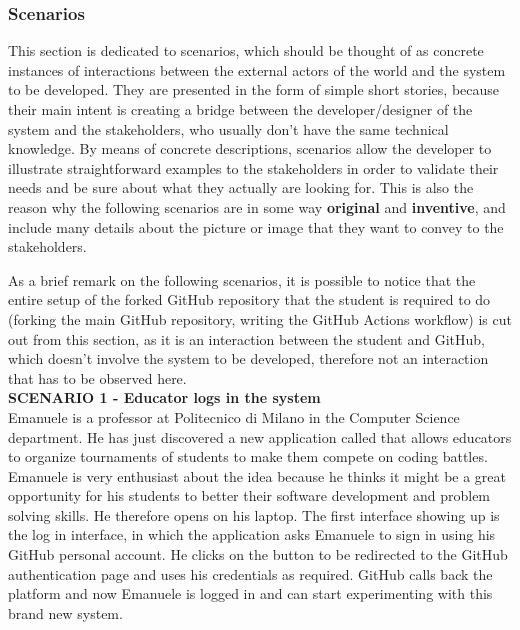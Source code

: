 \subsubsection{Scenarios}
This section is dedicated to scenarios, which should be thought of as concrete instances of interactions between the external actors of the world and the system to be developed.
They are presented in the form of simple short stories, because their main intent is creating a bridge between the developer/designer of the system and the stakeholders, who usually don't have the same technical knowledge. By means of concrete descriptions, scenarios allow the developer to illustrate straightforward examples to the stakeholders in order to validate their needs and be sure about what they actually are looking for. 
This is also the reason why the following scenarios are in some way \textbf{original} and \textbf{inventive}, and include many details about the picture or image that they want to convey to the stakeholders.

As a brief remark on the following scenarios, it is possible to notice that the entire setup of the forked GitHub repository that the student is required to do (forking the main GitHub repository, writing the GitHub Actions workflow) is cut out from this section, as it is an interaction between the student and GitHub, which doesn't involve the system to be developed, therefore not an interaction that has to be observed here.\\

\textbf{SCENARIO 1 - Educator logs in the system} \\
    Emanuele is a professor at Politecnico di Milano in the Computer Science department. He has just discovered a new application called \app that allows educators to organize tournaments of students to make them compete on coding battles.\\
    Emanuele is very enthusiast about the idea because he thinks it might be a great opportunity for his students to better their software development and problem solving skills. He therefore opens \app on his laptop. The first interface showing up is the log in interface, in which the application asks Emanuele to sign in using his GitHub personal account. He clicks on the button to be redirected to the GitHub authentication page and uses his credentials as required. GitHub calls back the \app platform and now Emanuele is logged in and can start experimenting with this brand new system.\\
    
